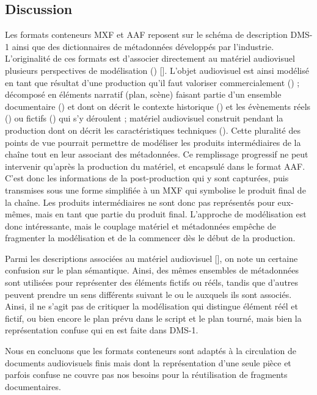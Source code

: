 \subsection*{Discussion}
Les formats conteneurs MXF et AAF reposent sur le schéma de description DMS-1 ainsi que des dictionnaires de métadonnées développés par l'industrie.
L'originalité de ces formats est d'associer directement au matériel audiovisuel plusieurs perspectives de modélisation () [].
L'objet audiovisuel est ainsi modélisé en tant que résultat d'une production qu'il faut valoriser commercialement () ; 
décomposé en éléments narratif (plan, scène) faisant partie d'un ensemble documentaire () et dont on décrit le contexte historique () et les évènements réels () ou fictifs () qui s'y déroulent ; matériel audiovisuel construit pendant la production dont on décrit les caractéristiques techniques ().
Cette pluralité des points de vue pourrait permettre de modéliser les produits intermédiaires de la chaîne tout en leur associant des métadonnées. 
Ce remplissage progressif ne peut intervenir qu'après la production du matériel, et encapsulé dans le format AAF. 
C'est donc les informations de la post-production qui y sont capturées, puis transmises sous une forme simplifiée à un MXF qui symbolise le produit final de la chaîne.
Les produits intermédiaires ne sont donc pas représentés pour eux-mêmes, mais en tant que partie du produit final.
L'approche de modélisation est donc intéressante, mais le couplage matériel et métadonnées empêche de fragmenter la modélisation et de la commencer dès le début de la production.

Parmi les descriptions associées au matériel audiovisuel [], on note un certaine confusion sur le plan sémantique. 
Ainsi, des mêmes ensembles de métadonnées sont utilisées pour représenter des éléments fictifs ou rééls, tandis que d'autres peuvent prendre un sens différents suivant le  ou le  auxquels ils sont associés.
Ainsi, il ne s'agit pas de critiquer la modélisation qui distingue élément réél et fictif, ou bien encore le plan prévu dans le script et le plan tourné, mais bien la représentation confuse qui en est faite dans DMS-1.

Nous en concluons que les formats conteneurs sont adaptés à la circulation de documents audiovisuels finis mais dont la représentation d'une seule pièce et parfois confuse ne couvre pas nos besoins pour la réutilisation de fragments documentaires.
